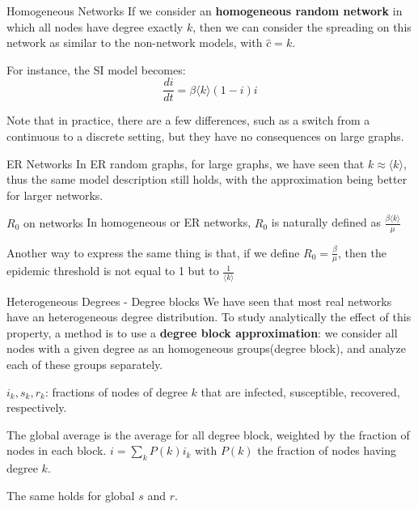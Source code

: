 \documentclass[a4paper,11pt]{book}
\begin{document}
\begin{textbox}{Homogeneous Networks}
If we consider an \textbf{homogeneous random network} in which all nodes have degree exactly $k$, then we can consider the spreading on this network as similar to the non-network models, with $\hat{c}=k$. 

For instance, the SI model becomes:
\[
\frac{di}{dt}=\beta \langle k \rangle (1-i)i
\]

Note that in practice, there are a few differences, such as a switch from a continuous to a discrete setting, but they have no consequences on large graphs.

\end{textbox}




\begin{textbox}{ER Networks}
In ER random graphs, for large graphs, we have seen that $k\approx \langle k \rangle$, thus the same model description still holds, with the approximation being better for larger networks.

\end{textbox}

\begin{textbox}{$R_0$ on networks}
In homogeneous or ER networks, $R_0$ is naturally defined as $\frac{\beta \langle k \rangle}{\mu}$
    
Another way to express the same thing is that, if we define $R_0=\frac{\beta}{\mu}$, then the epidemic threshold is not equal to 1 but to $\frac{1}{\langle k \rangle}$
    
\end{textbox}











\begin{textbox}{Heterogeneous Degrees - Degree blocks}
We have seen that most real networks have an heterogeneous degree distribution. To study analytically the effect of this property, a method is to use a \textbf{degree block approximation}: we consider all nodes with a given degree as an homogeneous groups(degree block), and analyze each of these groups separately.

$i_k,s_k,r_k$: fractions of nodes of degree $k$ that are infected, susceptible, recovered, respectively.

The global average is the average for all degree block, weighted by the fraction of nodes in each block.
$i=\sum_k P(k)i_k$
with $P(k)$ the fraction of nodes having degree $k$.

The same holds for global $s$ and $r$.
\end{textbox}
\end{document}
